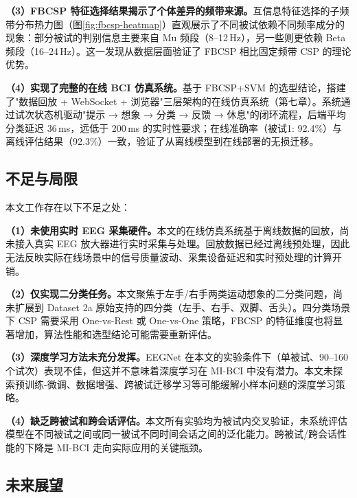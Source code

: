 \textbf{（3）FBCSP 特征选择结果揭示了个体差异的频带来源。}互信息特征选择的子频带分布热力图（图\ref{fig:fbcsp-heatmap}）直观展示了不同被试依赖不同频率成分的现象：部分被试的判别信息主要来自 Mu 频段（8--12\,Hz），另一些则更依赖 Beta 频段（16--24\,Hz）。这一发现从数据层面验证了 FBCSP 相比固定频带 CSP 的理论优势。

\textbf{（4）实现了完整的在线 BCI 仿真系统。}基于 FBCSP+SVM 的选型结论，搭建了"数据回放 + WebSocket + 浏览器"三层架构的在线仿真系统（第七章）。系统通过试次状态机驱动"提示 → 想象 → 分类 → 反馈 → 休息"的闭环流程，后端平均分类延迟 36\,ms，远低于 200\,ms 的实时性要求；在线准确率（被试1: 92.4\%）与离线评估结果（92.3\%）一致，验证了从离线模型到在线部署的无损迁移。

\subsection{不足与局限}

本文工作存在以下不足之处：

\textbf{（1）未使用实时 EEG 采集硬件。}本文的在线仿真系统基于离线数据的回放，尚未接入真实 EEG 放大器进行实时采集与处理。回放数据已经过离线预处理，因此无法反映实际在线场景中的信号质量波动、采集设备延迟和实时预处理的计算开销。

\textbf{（2）仅实现二分类任务。}本文聚焦于左手/右手两类运动想象的二分类问题，尚未扩展到 Dataset 2a 原始支持的四分类（左手、右手、双脚、舌头）。四分类场景下 CSP 需要采用 One-vs-Rest 或 One-vs-One 策略，FBCSP 的特征维度也将显著增加，算法性能和选型结论可能需要重新评估。

\textbf{（3）深度学习方法未充分发挥。}EEGNet 在本文的实验条件下（单被试、90--160 个试次）表现不佳，但这并不意味着深度学习在 MI-BCI 中没有潜力。本文未探索预训练-微调、数据增强、跨被试迁移学习等可能缓解小样本问题的深度学习策略。

\textbf{（4）缺乏跨被试和跨会话评估。}本文所有实验均为被试内交叉验证，未系统评估模型在不同被试之间或同一被试不同时间会话之间的泛化能力。跨被试/跨会话性能的下降是 MI-BCI 走向实际应用的关键瓶颈。

\subsection{未来展望}

